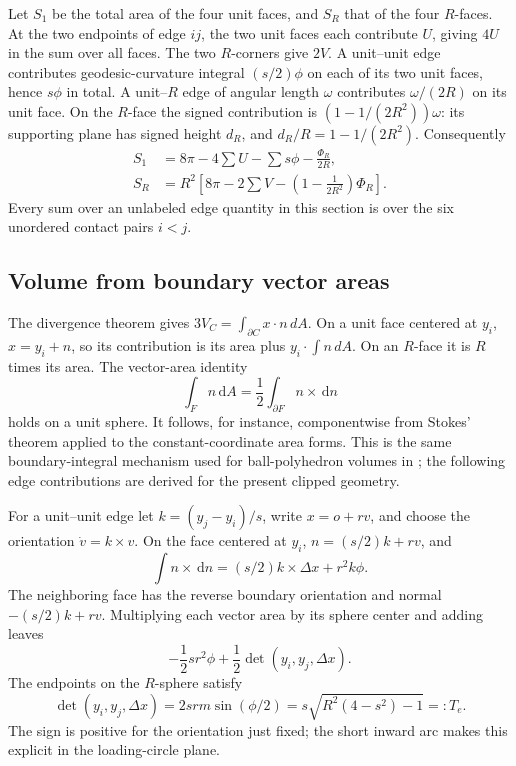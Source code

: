 \documentclass[11pt]{article}
\numberwithin{equation}{section}
\theoremstyle{definition}\newtheorem{definition}[theorem]{Definition}
\theoremstyle{remark}\newtheorem{remark}[theorem]{Remark}
\newcommand{\dd}{\,\mathrm d}
\begin{document}
Let $S_1$ be the total area of the four unit faces, and $S_R$ that of the
four $R$-faces. At the two endpoints of edge $ij$, the two unit faces each
contribute $U$, giving $4U$ in the sum over all faces. The two $R$-corners
give $2V$. A unit--unit edge contributes geodesic-curvature integral
$(s/2)\phi$ on each of its two unit faces, hence $s\phi$ in total.
A unit--$R$ edge of angular length $\omega$ contributes $\omega/(2R)$ on
its unit face. On the $R$-face the signed contribution is
$(1-1/(2R^2))\omega$: its supporting plane has signed height $d_R$, and
$d_R/R=1-1/(2R^2)$. Consequently
\begin{align}
 S_1&=8\pi-4\sum U-\sum s\phi-\frac{\Phi_R}{2R},\label{eq:S1}\\
 S_R&=R^2\left[8\pi-2\sum V-
                   \left(1-\frac1{2R^2}\right)\Phi_R\right].\label{eq:SR}
\end{align}
Every sum over an unlabeled edge quantity in this section is over the six
unordered contact pairs $i<j$.

\subsection{Volume from boundary vector areas}
The divergence theorem gives $3V_C=\int_{\partial C}x\cdot n\,dA$.
On a unit face centered at $y_i$, $x=y_i+n$, so its contribution is its area
plus $y_i\cdot\int n\,dA$. On an $R$-face it is $R$ times its area.
The vector-area identity
\begin{equation}\label{eq:vectorarea}
 \int_F n\dd A=\frac12\int_{\partial F}n\times\dd n
\end{equation}
holds on a unit sphere. It follows, for instance, componentwise from Stokes'
theorem applied to the constant-coordinate area forms. This is the same
boundary-integral mechanism used for ball-polyhedron volumes in
\cite{HyndVolume}; the following edge contributions are derived for the
present clipped geometry.

For a unit--unit edge let $k=(y_j-y_i)/s$, write $x=o+r v$, and choose the
orientation $\dot v=k\times v$. On the face centered at $y_i$,
$n=(s/2)k+rv$, and
\[
 \int n\times\dd n=(s/2)k\times\Delta x+r^2k\phi.
\]
The neighboring face has the reverse boundary orientation and normal
$-(s/2)k+rv$. Multiplying each vector area by its sphere center and adding
leaves
\[
 -\frac12sr^2\phi+\frac12\det(y_i,y_j,\Delta x).
\]
The endpoints on the $R$-sphere satisfy
\[
 \det(y_i,y_j,\Delta x)=2srm\sin(\phi/2)
   =s\sqrt{R^2(4-s^2)-1}=:T_e.
\]
The sign is positive for the orientation just fixed; the short inward arc
makes this explicit in the loading-circle plane.
\end{document}
